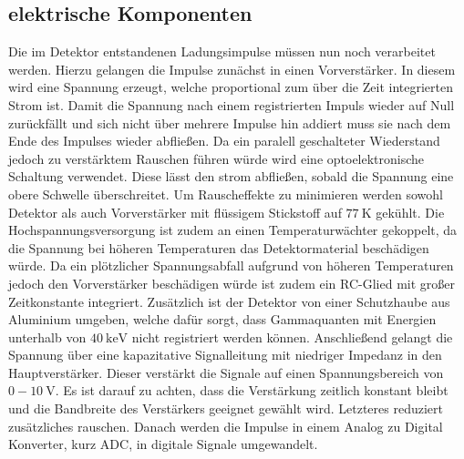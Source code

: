 \subsection{elektrische Komponenten}
Die im Detektor entstandenen Ladungsimpulse müssen nun noch verarbeitet werden. Hierzu gelangen die Impulse zunächst in einen Vorverstärker. In diesem wird eine Spannung erzeugt, welche proportional zum über die Zeit integrierten Strom ist. Damit die Spannung nach einem registrierten Impuls wieder auf Null zurückfällt und sich nicht über mehrere Impulse hin addiert muss sie nach dem Ende des Impulses wieder abfließen. Da ein paralell geschalteter Wiederstand jedoch zu verstärktem Rauschen führen würde wird eine optoelektronische Schaltung verwendet. Diese lässt den strom abfließen, sobald die Spannung eine obere Schwelle überschreitet. Um Rauscheffekte zu minimieren werden sowohl Detektor als auch Vorverstärker mit flüssigem Stickstoff auf $\SI{77}{\kelvin}$ gekühlt. Die Hochspannungsversorgung ist zudem an einen Temperaturwächter gekoppelt, da die Spannung bei höheren Temperaturen das Detektormaterial beschädigen würde. Da ein plötzlicher Spannungsabfall aufgrund von höheren Temperaturen jedoch den Vorverstärker beschädigen würde ist zudem ein RC-Glied mit großer Zeitkonstante integriert. Zusätzlich ist der Detektor von einer Schutzhaube aus Aluminium umgeben, welche dafür sorgt, dass Gammaquanten mit Energien unterhalb von $\SI{40}{\kilo\electronvolt}$ nicht registriert werden können. Anschließend gelangt die Spannung über eine kapazitative Signalleitung mit niedriger Impedanz in den Hauptverstärker. Dieser verstärkt die Signale auf einen Spannungsbereich von $0 - \SI{10}{\volt}$. Es ist darauf zu achten, dass die Verstärkung zeitlich konstant bleibt und die Bandbreite des Verstärkers geeignet gewählt wird. Letzteres reduziert zusätzliches rauschen. Danach werden die Impulse in einem Analog zu Digital Konverter, kurz ADC, in digitale Signale umgewandelt. 


